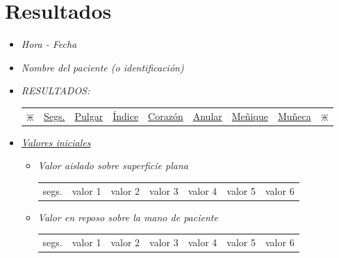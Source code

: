 

\chapter{Resultados\label{sec:anexo2}}



\begin{itemize} [label=$ \rhd $] \addtolength{\itemsep}{-4mm} %
	\item \textit{Hora - Fecha}
	\item \textit{Nombre del paciente (o identificación)}
	\item \textit{RESULTADOS:}\vspace{-6mm}
	\begin{table}[H]
		\hspace{1cm} %
		\renewcommand{\arraystretch}{2}
		\begin{tabular}{ccccccccc}
			$ \divideontimes $ & \underline{Segs.} & \underline{Pulgar} & \underline{Índice} & \underline{Corazón} & \underline{Anular} & \underline{Meñique} & \underline{Muñeca} & $ \divideontimes $  \\
		\end{tabular} 
	\end{table}
	\vspace{-6mm}
	\item \textit{\underline{Valores iniciales}}
	\begin{itemize} [label= $  \triangleright $] \addtolength{\itemsep}{-5mm} %
		\item \textit{Valor aislado sobre superficie plana}	\vspace{-6mm}
		\begin{table}[H]
			\hspace{2cm}
			\renewcommand{\arraystretch}{2}
			\begin{tabular}{ccccccc}
				segs.& valor 1 & valor 2 & valor 3 & valor 4 & valor 5 & valor 6  \\
			\end{tabular} 
		\end{table}			
		\item \textit{Valor en reposo sobre la mano de paciente} \vspace{-6mm}
		\begin{table}[H]
			\hspace{2cm}
			\renewcommand{\arraystretch}{2}
			\begin{tabular}{ccccccc}
				segs.& valor 1 & valor 2 & valor 3 & valor 4 & valor 5 & valor 6  \\

\end{tabular}
\end{table}
\end{itemize}
\end{itemize}
